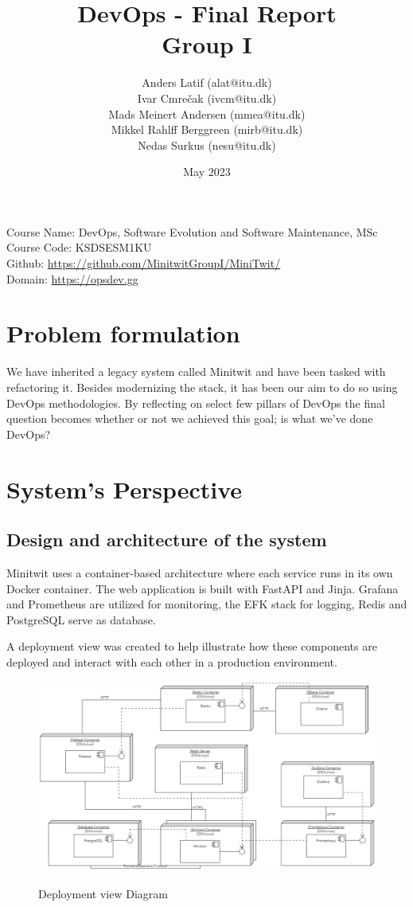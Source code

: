 \documentclass{article}
\title{DevOps - Final Report\\
  \large Group I
}
\author{
Anders Latif (alat@itu.dk)\\
Ivar Cmrečak (ivcm@itu.dk)\\
Mads Meinert Andersen (mmea@itu.dk) \\
Mikkel Rahlff Berggreen (mirb@itu.dk)\\ 
Nedas Surkus (nesu@itu.dk)\\
}
\date{May 2023}
\begin{document}
\maketitle

\vspace*{\fill}
\noindent Course Name: DevOps, Software Evolution and Software Maintenance, MSc\\
Course Code: KSDSESM1KU\\
Github: \url{https://github.com/MinitwitGroupI/MiniTwit/}\\
Domain: \url{https://opsdev.gg}


\pagebreak

\tableofcontents
\pagebreak

\section{Problem formulation}

We have inherited a legacy system called Minitwit and have been tasked with refactoring it. Besides modernizing the stack, it has been our aim to do so using DevOps methodologies. By reflecting on select few pillars of DevOps the final question becomes whether or not we achieved this goal; is what we've done DevOps?

\section{System's Perspective} 

\subsection{Design and architecture of the system}

Minitwit uses a container-based architecture where each service runs in its own Docker container. The web application is built with FastAPI and Jinja. Grafana and Prometheus are utilized for monitoring, the EFK stack for logging, Redis and PostgreSQL serve as database.

A deployment view was created to help illustrate how these components are deployed and interact with each other in a production environment.

\begin{figure}[h]
    \includegraphics[width=1\textwidth]{images/DeploymentView2.0.jpg}
    \label{fig:ci_pipeline}
    \centering
    \caption{Deployment view Diagram}
\end{figure}
\end{document}
